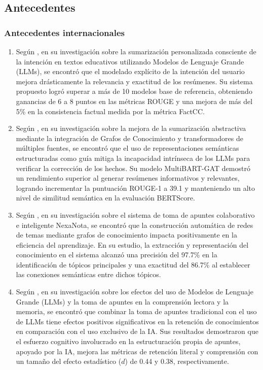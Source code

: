 
\subsection{Antecedentes}
\subsubsection{Antecedentes internacionales}
\begin{enumerate}[label=\alph*)]

\item Según \textcite{Ning2025}, en su investigación sobre la sumarización personalizada consciente de la intención en textos educativos utilizando Modelos de Lenguaje Grande (LLMs), se encontró que el modelado explícito de la intención del usuario mejora drásticamente la relevancia y exactitud de los resúmenes. Su sistema propuesto logró superar a más de 10 modelos base de referencia, obteniendo ganancias de 6 a 8 puntos en las métricas ROUGE y una mejora de más del 5\% en la consistencia factual medida por la métrica FactCC.

\item Según \textcite{Chen2023}, en su investigación sobre la mejora de la sumarización abstractiva mediante la integración de Grafos de Conocimiento y transformadores de múltiples fuentes, se encontró que el uso de representaciones semánticas estructuradas como guía mitiga la incapacidad intrínseca de los LLMs para verificar la corrección de los hechos. Su modelo MultiBART-GAT demostró un rendimiento superior al generar resúmenes informativos y relevantes, logrando incrementar la puntuación ROUGE-1 a 39.1 y manteniendo un alto nivel de similitud semántica en la evaluación BERTScore.

\item Según \textcite{Jiang2025}, en su investigación sobre el sistema de toma de apuntes colaborativo e inteligente NexaNota, se encontró que la construcción automática de redes de temas mediante grafos de conocimiento impacta positivamente en la eficiencia del aprendizaje. En su estudio, la extracción y representación del conocimiento en el sistema alcanzó una precisión del 97.7\% en la identificación de tópicos principales y una exactitud del 86.7\% al establecer las conexiones semánticas entre dichos tópicos.

\item Según \textcite{Kreijkes2026}, en su investigación sobre los efectos del uso de Modelos de Lenguaje Grande (LLMs) y la toma de apuntes en la comprensión lectora y la memoria, se encontró que combinar la toma de apuntes tradicional con el uso de LLMs tiene efectos positivos significativos en la retención de conocimientos en comparación con el uso exclusivo de la IA. Sus resultados demostraron que el esfuerzo cognitivo involucrado en la estructuración propia de apuntes, apoyado por la IA, mejora las métricas de retención literal y comprensión con un tamaño del efecto estadístico ($d$) de 0.44 y 0.38, respectivamente.


\end{enumerate}
